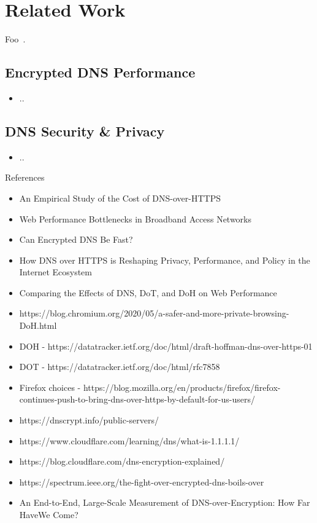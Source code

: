 \section{Related Work}\label{sec:related}
Foo~\cite{reich2013modular}.

\subsection{Encrypted DNS Performance}
\begin{itemize}
    \item ..
\end{itemize}

\subsection{DNS Security \& Privacy}
\begin{itemize}
    \item ..
\end{itemize}

References
\begin{itemize}
    \item   An Empirical Study of the Cost of DNS-over-HTTPS
    \item	Web Performance Bottlenecks in Broadband Access Networks
    \item 	Can Encrypted DNS Be Fast?
    \item 	How DNS over HTTPS is Reshaping Privacy, Performance, and Policy in the Internet Ecosystem
    \item 	Comparing the Effects of DNS, DoT, and DoH on Web Performance
    \item 	https://blog.chromium.org/2020/05/a-safer-and-more-private-browsing-DoH.html
    \item 	DOH - https://datatracker.ietf.org/doc/html/draft-hoffman-dns-over-https-01
    \item 	DOT - https://datatracker.ietf.org/doc/html/rfc7858 
    \item 	Firefox choices - https://blog.mozilla.org/en/products/firefox/firefox-continues-push-to-bring-dns-over-https-by-default-for-us-users/ 
    \item 	https://dnscrypt.info/public-servers/
    \item 	https://www.cloudflare.com/learning/dns/what-is-1.1.1.1/
    \item 	https://blog.cloudflare.com/dns-encryption-explained/
    \item 	https://spectrum.ieee.org/the-fight-over-encrypted-dns-boils-over
    \item 	An End-to-End, Large-Scale Measurement of DNS-over-Encryption: How Far HaveWe Come?
\end{itemize}

